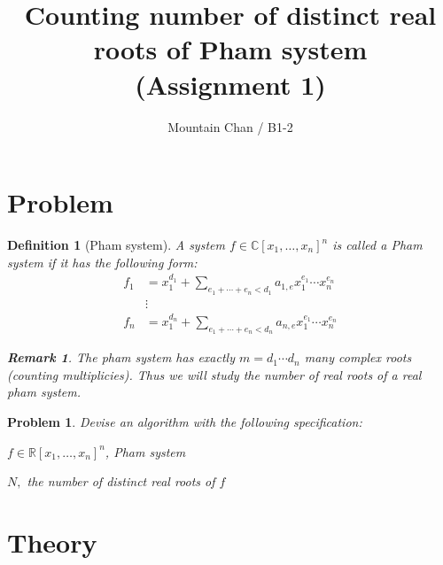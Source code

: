 \documentclass{article}%
\newtheorem{definition}[theorem]{Definition}
\newtheorem{problem}[theorem]{Problem}
\newtheorem{remark}[theorem]{Remark}
\begin{document}
\title{Counting number of distinct real roots of Pham system\\(Assignment 1)}
\author{Mountain Chan / B1-2}
\maketitle



\section{Problem}

\begin{definition}
[Pham system]A system $f\in\mathbb{C}\left[  x_{1},\ldots,x_{n}\right]^{n}$
is called a Pham system if it has the following form:%
\begin{align*}
f_{1}  &  =x_{1}^{d_{1}}+\sum_{e_{1}+\cdots+e_{n}<d_{1}}a_{1,e}x_{1}^{e_{1}}\cdots x_{n}^{e_{n}}\\
&  \vdots\\
f_{n}  &  =x_{1}^{d_{n}}+\sum_{e_{1}+\cdots+e_{n}<d_{n}}a_{n,e}x_{1}^{e_{1}}\cdots x_{n}^{e_{n}}%
\end{align*}

\begin{remark}
The pham system has exactly $m=d_{1}\cdots d_{n}$ many complex roots (counting multiplicies). 
Thus we will study the number of real roots of a real pham system.
\end{remark}
\end{definition}

\begin{problem}
Devise an algorithm with the following specification:

\begin{description}[leftmargin=3em,style=nextline,itemsep=0.5em]

\item[In:] $f\in\mathbb{R}\left[  x_{1},\ldots,x_{n}\right]^{n}$, Pham system

\item[Out:] $N,$ the number of distinct real roots of $f$
\end{description}
\end{problem}

\section{Theory}
\end{document}
